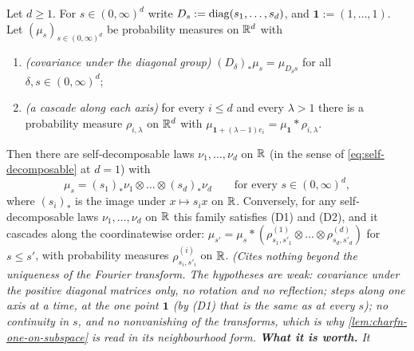 \begin{proposition}
\label{prop:fixed-frame-families}
\leanok
Let $d \ge 1$. For $s \in (0,\infty)^d$ write $D_s := \operatorname{diag}(s_1,\dots,s_d)$, and $\mathbf 1 :=
(1,\dots,1)$. Let $(\mu_s)_{s\in(0,\infty)^d}$ be probability measures on $\mathbb{R}^d$ with
\begin{enumerate}
\item[(D1)] \emph{(covariance under the diagonal group)} $(D_\delta)_*\mu_s = \mu_{D_\delta s}$ for
all $\delta, s \in (0,\infty)^d$;
\item[(D2)] \emph{(a cascade along each axis)} for every $i \le d$ and every $\lambda > 1$ there is
a probability measure $\rho_{i,\lambda}$ on $\mathbb{R}^d$ with
$\mu_{\mathbf 1 + (\lambda - 1)e_i} = \mu_{\mathbf 1} * \rho_{i,\lambda}$.
\end{enumerate}
Then there are self-decomposable laws $\nu_1, \dots, \nu_d$ on $\mathbb{R}$
(in the sense of \ref{eq:self-decomposable} at $d = 1$) with
\[
  \mu_s = (s_1)_*\nu_1 \otimes \dots \otimes (s_d)_*\nu_d \qquad \text{for every } s \in (0,\infty)^d ,
\]
where $(s_i)_*$ is the image under $x \mapsto s_ix$ on $\mathbb{R}$. Conversely, for any self-decomposable
laws $\nu_1, \dots, \nu_d$ on $\mathbb{R}$ this family satisfies (D1) and (D2), and it cascades along
the coordinatewise order: $\mu_{s'} = \mu_s * (\rho^{(1)}_{s_1,s'_1} \otimes \dots \otimes \rho^{(d)}_{s_d,s'_d})$ for $s \le s'$,
with probability measures $\rho^{(i)}_{s_i,s'_i}$ on $\mathbb{R}$.
\statusT\quad\emph{(Cites nothing beyond the uniqueness of the Fourier transform. The hypotheses
are weak: covariance under the positive diagonal matrices only, no rotation and no reflection;
steps along one axis at a time, at the one point $\mathbf 1$ (by (D1) that is the same as at every
$s$); no continuity in $s$, and no nonvanishing of the transforms, which is why
\ref{lem:charfn-one-on-subspace} is read in its neighbourhood form. \textbf{What it is worth.} It
}
\end{proposition}
